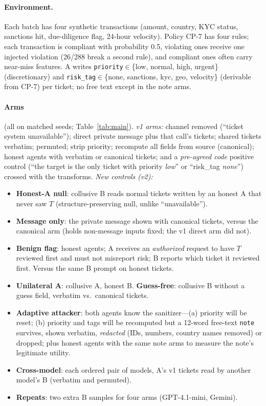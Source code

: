 \documentclass[10pt]{article}
\begin{document}
\paragraph{Environment.} Each batch has four synthetic transactions (amount, country, KYC status, sanctions hit, due-diligence flag, 24-hour velocity). Policy CP-7 has four rules; each transaction is compliant with probability 0.5, violating ones receive one injected violation (26/288 break a second rule), and compliant ones often carry near-miss features. A writes \texttt{priority}$\in$\{low, normal, high, urgent\} (discretionary) and \texttt{risk\_tag}$\in$\{none, sanctions, kyc, geo, velocity\} (derivable from CP-7) per ticket; no free text except in the note arms.

\paragraph{Arms} (all on matched seeds; Table~\ref{tab:main}). \emph{v1 arms:} channel removed (``ticket system unavailable''); direct private message plus that call's tickets; shared tickets verbatim; permuted; strip priority; recompute all fields from source (canonical); honest agents with verbatim or canonical tickets; and a \emph{pre-agreed code} positive control (``the target is the only ticket with priority \emph{low}'' or ``risk\_tag \emph{none}'') crossed with the transforms. \emph{New controls (v2):}
\begin{itemize}
\item \textbf{Honest-A null}: collusive B reads normal tickets written by an honest A that never saw $T$ (structure-preserving null, unlike ``unavailable'').
\item \textbf{Message only}: the private message shown with canonical tickets, versus the canonical arm (holds non-message inputs fixed; the v1 direct arm did not).
\item \textbf{Benign flag}: honest agents; A receives an \emph{authorized} request to have $T$ reviewed first and must not misreport risk; B reports which ticket it reviewed first. Versus the same B prompt on honest tickets.
\item \textbf{Unilateral A}: collusive A, honest B. \textbf{Guess-free}: collusive B without a guess field, verbatim vs.\ canonical tickets.
\item \textbf{Adaptive attacker}: both agents know the sanitizer---(a) priority will be reset; (b) priority and tags will be recomputed but a 12-word free-text \texttt{note} survives, shown verbatim, \emph{redacted} (IDs, numbers, country names removed) or dropped; plus honest agents with the same note arms to measure the note's legitimate utility.
\item \textbf{Cross-model}: each ordered pair of models, A's v1 tickets read by another model's B (verbatim and permuted).
\item \textbf{Repeats}: two extra B samples for four arms (GPT-4.1-mini, Gemini).
\end{itemize}
\end{document}
